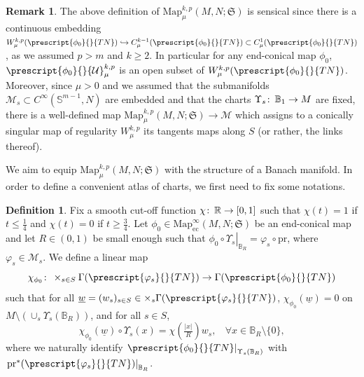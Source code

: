 \documentclass{article}
\numberwithin{equation}{section}        %
\theoremstyle{bfnote}
\theoremstyle{definition}
\newtheorem{Def}[thm]{Definition}           %
\theoremstyle{bfremark}
\newtheorem{rem}[thm]{Remark}               %
\newcommand{\col}{\colon \thinspace}        %
\newcommand{\R}{\mathbb{R}}                 %
\newcommand{\Ball}{\mathbb{B}}              %
\newcommand{\Sp}{\mathbb{S}}                %
\newcommand{\Map}{\mathrm{Map}}             %
\newcommand{\pr}{\mathrm{pr}}               %
\begin{document}
\begin{rem}
    The above definition of $\Map^{k,p}_\mu(M,N;\mathfrak{S})$ is sensical since there is a continuous embedding $W^{k,p}_\mu(\prescript{\phi_0}{}{TN}) \hookrightarrow C^{k-1}_\mu(\prescript{\phi_0}{}{TN}) \subset C^1_\mu(\prescript{\phi_0}{}{TN})$, as we assumed $p > m$ and $k \geq 2$. In particular for any end-conical map $\phi_0$, $\prescript{\phi_0}{}{\mathcal{U}}^{k,p}_\mu$ is an open subset of $W^{k,p}_\mu(\prescript{\phi_0}{}{TN})$. Moreover, since $\mu > 0$ and we assumed that the submanifolds $\mathcal{M}_s \subset C^\infty(\Sp^{m-1},N)$ are embedded and that the charts $\Upsilon_s \col \Ball_1 \to M$ are fixed, there is a well-defined map $\Map^{k,p}_\mu(M,N;\mathfrak{S}) \to \mathcal{M}$ which assigns to a conically singular map of regularity $W^{k,p}_\mu$ its tangents maps along $S$ (or rather, the links thereof).
\end{rem}

We aim to equip $\Map^{k,p}_\mu(M,N;\mathfrak{S})$ with the structure of a Banach manifold. In order to define a convenient atlas of charts, we first need to fix some notations.

\begin{Def}     \label{Def: Banach manifold charts preliminary definitions}
    Fix a smooth cut-off function $\chi \col \R \to [0,1]$ such that $\chi(t) = 1$ if $t \leq \frac{1}{4}$ and $\chi(t) = 0$ if $t \geq \frac{3}{4}$. Let $\phi_0 \in \Map^\infty_{\mathrm{ec}}(M,N;\mathfrak{S})$ be an end-conical map and let $R \in (0,1)$ be small enough such that $\left. \phi_0 \circ \Upsilon_s \right|_{\Ball_R} = \varphi_s \circ \pr$, where $\varphi_s \in \mathcal{M}_s$. We define a linear map
    \begin{equation*}
        \chi_{\phi_0} \col \times_{s \in S} \Gamma(\prescript{\varphi_s}{}{TN}) \to \Gamma(\prescript{\phi_0}{}{TN})
    \end{equation*}
    such that for all $\underline{w} = (w_s)_{s \in S} \in \times_s \Gamma(\prescript{\varphi_s}{}{TN})$, $\chi_{\phi_0}(\underline{w}) = 0$ on $M \setminus (\cup_s \Upsilon_s(\Ball_R))$, and for all $s \in S$,
    \begin{equation*}
        \chi_{\phi_0}(\underline{w}) \circ \Upsilon_s(x) = \chi(\tfrac{|x|}{R}) w_s, ~~~~ \forall x \in \Ball_R \setminus \{0\},
        \end{equation*}
    where we naturally identify $\left. \prescript{\phi_0}{}{TN}\right|_{\Upsilon_s(\Ball_R)}$ with $\left.\pr^* (\prescript{\varphi_s}{}{TN})\right|_{\Ball_R}$.
\end{Def}
\end{document}
